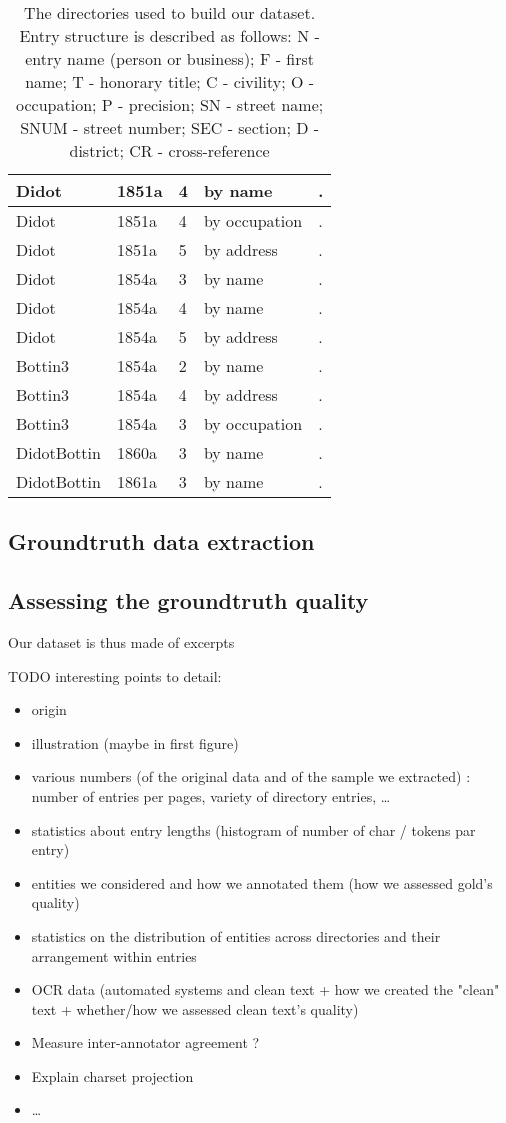 \begin{table}[h!]
{\begin{tabular}{|l|l|l|l|l|}
Didot & 1851a & 4 & by name & .
\\ \hline
Didot & 1851a & 4 &	by occupation & .
\\ \hline
Didot & 1851a & 5 & by address & .
\\ \hline
Didot & 1854a & 3 &	by name & .
\\ \hline
Didot & 1854a & 4 & by name & .
\\ \hline
Didot & 1854a &	5 & by address & .
\\ \hline
Bottin3 & 1854a & 2 & by name & .
\\ \hline
Bottin3 & 1854a & 4 & by address & .
\\ \hline
Bottin3 & 1854a	& 3 & by occupation & .
\\ \hline
DidotBottin & 1860a	& 3	& by name & .
\\ \hline
DidotBottin & 1861a	& 3	& by name & .
\\ \hline
\end{tabular}%
}
\caption{The directories used to build our dataset. Entry structure is described as follows: N - entry name (person or business); F - first name; T - honorary title; C - civility; O - occupation; P - precision; SN - street name; SNUM - street number; SEC - section; D - district; CR - cross-reference}
\label{tab:my-table}
\end{table}

\subsection{Groundtruth data extraction}

\subsection{Assessing the groundtruth quality}

Our dataset is thus made of excerpts 

TODO interesting points to detail:
\begin{itemize}
    \item origin
    \item illustration (maybe in first figure)
    \item various numbers (of the original data and of the sample we extracted) : number of entries per pages, variety of directory entries, \dots
    \item statistics about entry lengths (histogram of number of char / tokens par entry)
    \item entities we considered and how we annotated them (how we assessed gold's quality)
    \item statistics on the distribution of entities across directories and their arrangement within entries
    \item OCR data (automated systems and clean text + how we created the "clean" text + whether/how we assessed clean text's quality)
    \item Measure inter-annotator agreement ? 
    \item Explain charset projection
    \item \dots
\end{itemize}
